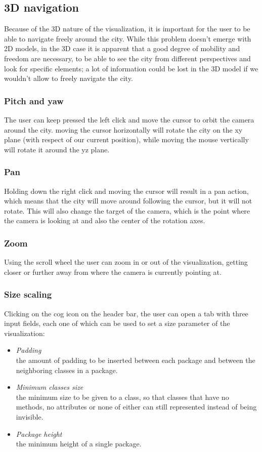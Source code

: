 \documentclass[]{usiinfbachelorproject}
\begin{document}
\subsection{3D navigation} \label{3D navigation}
Because of the 3D nature of the visualization, it is important for the user to be able to navigate freely around the city. While this problem doesn't emerge with 2D models, in the 3D case it is apparent that a good
degree of mobility and freedom are necessary, to be able to see the city from different perspectives and look for specific elements; a lot of information could be lost in the 3D model if we wouldn't allow to freely navigate the city.


\subsubsection{Pitch and yaw} \label{Pitch and yaw}
The user can keep pressed the left click and move the cursor to orbit the camera around the city. moving the cursor horizontally will rotate the city on the xy plane (with respect of our current position), while
moving the mouse vertically will rotate it around the yz plane.

\subsubsection{Pan} \label{Pan}
Holding down the right click and moving the cursor will result in a pan action, which means that the city will move around following the cursor, but it will not rotate. This will also change the target of the camera,
 which is the point where the camera is looking at and also the center of the rotation axes.

 \subsubsection{Zoom} \label{Zoom}
Using the scroll wheel the user can zoom in or out of the visualization, getting closer or further away from where the camera is currently pointing at.

\subsubsection{Size scaling} \label{Size scaling}
Clicking on the cog icon on the header bar, the user can open a tab with three input fields, each one of which can be used to set a size parameter of the visualization:

\begin{itemize}
\item \textit{Padding}\\ the amount of padding to be inserted between each package and between the neighboring classes in a package.
\item \textit{Minimum classes size}\\ the minimum size to be given to a class, so that classes that have no methods, no attributes or none of either can still represented instead of being invisible.
\item \textit{Package height}\\ the minimum height of a single package.
\end{itemize}
\end{document}
